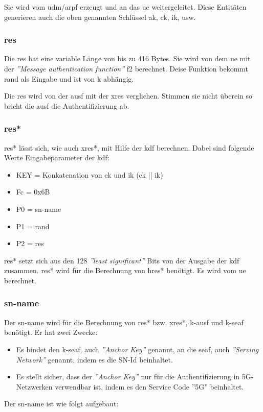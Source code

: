 Sie wird vom \gls{udm}/\gls{arpf} erzeugt und an das \gls{ue} weitergeleitet. Diese Entit\"aten generieren auch die oben genannten Schl\"ussel \gls{ak}, \gls{ck}, \gls{ik}, usw.

\subsubsection{\gls{res}}
Die \gls{res} hat eine variable L\"ange von bis zu 416 Bytes. %
Sie wird von dem \gls{ue} mit der \textit{''Message authentication function''} f2 berechnet.
Deise Funktion bekommt \gls{rand} als Eingabe und ist von \gls{k} abh\"angig. %

Die \gls{res} wird von der \gls{ausf} mit der \gls{xres} verglichen.
Stimmen sie nicht \"uberein so bricht die \gls{ausf} die Authentifizierung ab. %

\subsubsection{\gls{res*}}
\gls{res*} l\"asst sich, wie auch \gls{xres*}, mit Hilfe der \gls{kdf} berechnen.
Dabei sind folgende Werte Eingabeparameter der \gls{kdf}: %
\begin{itemize}
\item KEY = Konkatenation von \gls{ck} und \gls{ik} (\gls{ck} || \gls{ik})
\item Fc = 0x6B
\item P0 = \gls{sn-name}
\item P1 = \gls{rand}
\item P2 = \gls{res}
\end{itemize}

\gls{res*} setzt sich aus den 128 \textit{''least significant''} Bits von der Ausgabe der \gls{kdf} zusammen.
\gls{res*} wird f\"ur die Berechnung von \gls{hres*} ben\"otigt.
Es wird vom \gls{ue} berechnet.

\subsubsection{\gls{sn-name}}
Der \gls{sn-name} wird f\"ur die Berechnung von \gls{res*} bzw. \gls{xres*}, \gls{k-ausf} und \gls{k-seaf} ben\"otigt.
Er hat zwei Zwecke: %
\begin{itemize}
\item Es bindet den \gls{k-seaf}, auch  \textit{''Anchor Key''}  genannt, an die \gls{seaf}, auch \textit{''Serving Network''} genannt, indem es die SN-Id beinhaltet.
\item Es stellt sicher, dass der \textit{''Anchor Key''} nur f\"ur die Authentifizierung in 5G-Netzwerken verwendbar ist, indem es den Service Code ''5G'' beinhaltet.
\end{itemize}
Der \gls{sn-name} ist wie folgt aufgebaut: %

